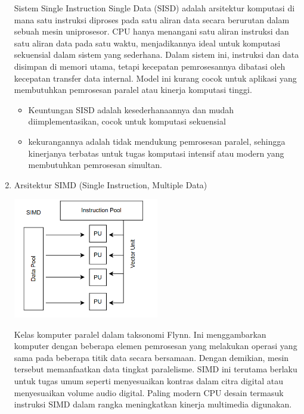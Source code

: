 \documentclass[12pt]{article}
\begin{document}
\begin{enumerate}
      Sistem Single Instruction Single Data (SISD) adalah arsitektur komputasi di mana satu instruksi diproses pada satu aliran data secara berurutan dalam sebuah mesin uniprosesor. CPU hanya menangani satu aliran instruksi dan satu aliran data pada satu waktu, menjadikannya ideal untuk komputasi sekuensial dalam sistem yang sederhana. Dalam sistem ini, instruksi dan data disimpan di memori utama, tetapi kecepatan pemrosesannya dibatasi oleh kecepatan transfer data internal. Model ini kurang cocok untuk aplikasi yang membutuhkan pemrosesan paralel atau kinerja komputasi tinggi.

    \begin{itemize}
        \item  Keuntungan  SISD adalah kesederhanaannya dan mudah diimplementasikan, cocok untuk komputasi sekuensial
        \item kekurangannya adalah tidak mendukung pemrosesan paralel, sehingga kinerjanya terbatas untuk tugas komputasi intensif atau modern yang membutuhkan pemrosesan simultan.
    \end{itemize}
    
    \item Arsitektur SIMD (Single Instruction, Multiple Data)

        \noindent
        \begin{minipage}{\linewidth}
            \centering
            \includegraphics[width=0.5\textwidth]{asset/image7.png} 
        \end{minipage}
    
    Kelas komputer paralel dalam taksonomi Flynn. Ini menggambarkan komputer dengan beberapa elemen pemrosesan yang melakukan operasi yang sama pada beberapa titik data secara bersamaan. Dengan demikian, mesin tersebut memanfaatkan data tingkat paralelisme. SIMD ini terutama berlaku untuk tugas umum seperti menyesuaikan kontras dalam citra digital atau menyesuaikan volume audio digital. Paling modern CPU desain termasuk instruksi SIMD dalam rangka meningkatkan kinerja multimedia digunakan.


\end{enumerate}
\end{document}

